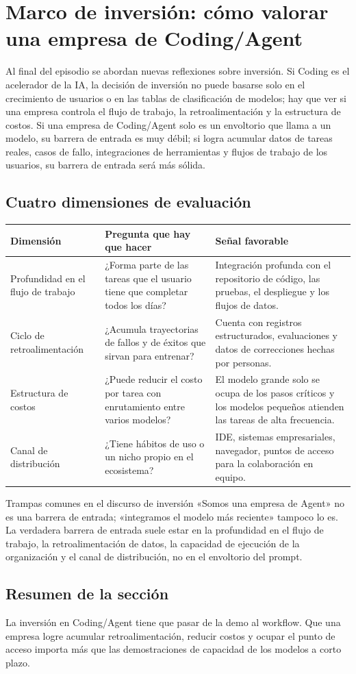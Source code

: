 \section{Marco de inversión: cómo valorar una empresa de Coding/Agent}

Al final del episodio se abordan nuevas reflexiones sobre inversión. Si Coding es el acelerador de la IA, la decisión de inversión no puede basarse solo en el crecimiento de usuarios o en las tablas de clasificación de modelos; hay que ver si una empresa controla el flujo de trabajo, la retroalimentación y la estructura de costos. Si una empresa de Coding/Agent solo es un envoltorio que llama a un modelo, su barrera de entrada es muy débil; si logra acumular datos de tareas reales, casos de fallo, integraciones de herramientas y flujos de trabajo de los usuarios, su barrera de entrada será más sólida.

\subsection{Cuatro dimensiones de evaluación}

\noindent\begin{tabularx}{\textwidth}{p{}p{}X}
\toprule
Dimensión & Pregunta que hay que hacer & Señal favorable \\
\midrule
Profundidad en el flujo de trabajo & ¿Forma parte de las tareas que el usuario tiene que completar todos los días? & Integración profunda con el repositorio de código, las pruebas, el despliegue y los flujos de datos. \\
Ciclo de retroalimentación & ¿Acumula trayectorias de fallos y de éxitos que sirvan para entrenar? & Cuenta con registros estructurados, evaluaciones y datos de correcciones hechas por personas. \\
Estructura de costos & ¿Puede reducir el costo por tarea con enrutamiento entre varios modelos? & El modelo grande solo se ocupa de los pasos críticos y los modelos pequeños atienden las tareas de alta frecuencia. \\
Canal de distribución & ¿Tiene hábitos de uso o un nicho propio en el ecosistema? & IDE, sistemas empresariales, navegador, puntos de acceso para la colaboración en equipo. \\
\bottomrule
\end{tabularx}

\begin{warningbox}{Trampas comunes en el discurso de inversión}
«Somos una empresa de Agent» no es una barrera de entrada; «integramos el modelo más reciente» tampoco lo es. La verdadera barrera de entrada suele estar en la profundidad en el flujo de trabajo, la retroalimentación de datos, la capacidad de ejecución de la organización y el canal de distribución, no en el envoltorio del prompt.
\end{warningbox}

\subsection{Resumen de la sección}

La inversión en Coding/Agent tiene que pasar de la demo al workflow. Que una empresa logre acumular retroalimentación, reducir costos y ocupar el punto de acceso importa más que las demostraciones de capacidad de los modelos a corto plazo.
